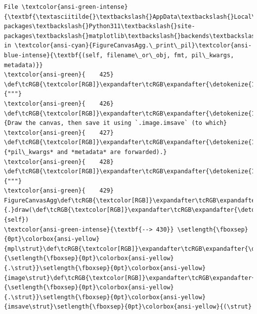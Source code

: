 \documentclass[11pt]{article}
\begin{document}
\begin{Verbatim}[commandchars=\\\{\}, frame=single, framerule=2mm, rulecolor=\color{outerrorbackground}]
File \textcolor{ansi-green-intense}{\textbf{\textasciitilde{}\textbackslash{}AppData\textbackslash{}Local\textbackslash{}Packages\textbackslash{}PythonSoftwareFoundation.Python.3.11\_qbz5n2kfra8p0\textbackslash{}LocalCache\textbackslash{}local-packages\textbackslash{}Python311\textbackslash{}site-packages\textbackslash{}matplotlib\textbackslash{}backends\textbackslash{}backend\_agg.py:430}}, in \textcolor{ansi-cyan}{FigureCanvasAgg.\_print\_pil}\textcolor{ansi-blue-intense}{\textbf{(self, filename\_or\_obj, fmt, pil\_kwargs, metadata)}}
\textcolor{ansi-green}{    425} \def\tcRGB{\textcolor[RGB]}\expandafter\tcRGB\expandafter{\detokenize{175,0,0}}{"""}
\textcolor{ansi-green}{    426} \def\tcRGB{\textcolor[RGB]}\expandafter\tcRGB\expandafter{\detokenize{175,0,0}}{Draw the canvas, then save it using `.image.imsave` (to which}
\textcolor{ansi-green}{    427} \def\tcRGB{\textcolor[RGB]}\expandafter\tcRGB\expandafter{\detokenize{175,0,0}}{*pil\_kwargs* and *metadata* are forwarded).}
\textcolor{ansi-green}{    428} \def\tcRGB{\textcolor[RGB]}\expandafter\tcRGB\expandafter{\detokenize{175,0,0}}{"""}
\textcolor{ansi-green}{    429} FigureCanvasAgg\def\tcRGB{\textcolor[RGB]}\expandafter\tcRGB\expandafter{\detokenize{98,98,98}}{.}draw(\def\tcRGB{\textcolor[RGB]}\expandafter\tcRGB\expandafter{\detokenize{0,135,0}}{self})
\textcolor{ansi-green-intense}{\textbf{--> 430}} \setlength{\fboxsep}{0pt}\colorbox{ansi-yellow}{mpl\strut}\def\tcRGB{\textcolor[RGB]}\expandafter\tcRGB\expandafter{\detokenize{98,98,98}}{\setlength{\fboxsep}{0pt}\colorbox{ansi-yellow}{.\strut}}\setlength{\fboxsep}{0pt}\colorbox{ansi-yellow}{image\strut}\def\tcRGB{\textcolor[RGB]}\expandafter\tcRGB\expandafter{\detokenize{98,98,98}}{\setlength{\fboxsep}{0pt}\colorbox{ansi-yellow}{.\strut}}\setlength{\fboxsep}{0pt}\colorbox{ansi-yellow}{imsave\strut}\setlength{\fboxsep}{0pt}\colorbox{ansi-yellow}{(\strut}

\end{Verbatim}
\end{document}
